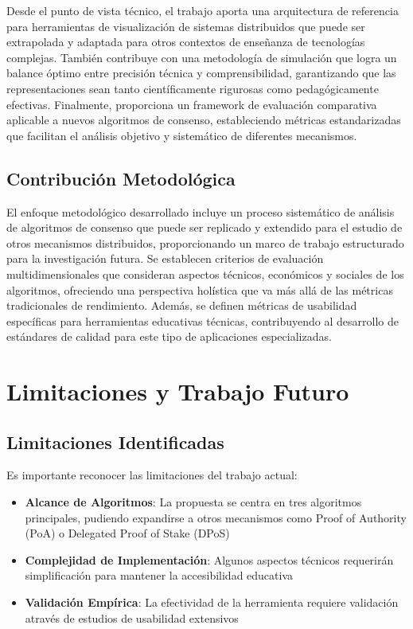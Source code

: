 \documentclass[spanish,12pt,letterpaper]{report}
\begin{document}
Desde el punto de vista técnico, el trabajo aporta una arquitectura de referencia para herramientas de visualización de sistemas distribuidos que puede ser extrapolada y adaptada para otros contextos de enseñanza de tecnologías complejas. También contribuye con una metodología de simulación que logra un balance óptimo entre precisión técnica y comprensibilidad, garantizando que las representaciones sean tanto científicamente rigurosas como pedagógicamente efectivas. Finalmente, proporciona un framework de evaluación comparativa aplicable a nuevos algoritmos de consenso, estableciendo métricas estandarizadas que facilitan el análisis objetivo y sistemático de diferentes mecanismos.

\subsection{Contribución Metodológica}

El enfoque metodológico desarrollado incluye un proceso sistemático de análisis de algoritmos de consenso que puede ser replicado y extendido para el estudio de otros mecanismos distribuidos, proporcionando un marco de trabajo estructurado para la investigación futura. Se establecen criterios de evaluación multidimensionales que consideran aspectos técnicos, económicos y sociales de los algoritmos, ofreciendo una perspectiva holística que va más allá de las métricas tradicionales de rendimiento. Además, se definen métricas de usabilidad específicas para herramientas educativas técnicas, contribuyendo al desarrollo de estándares de calidad para este tipo de aplicaciones especializadas.


\section{Limitaciones y Trabajo Futuro}

\subsection{Limitaciones Identificadas}

Es importante reconocer las limitaciones del trabajo actual:

\begin{itemize}
    \item \textbf{Alcance de Algoritmos}: La propuesta se centra en tres algoritmos principales, pudiendo expandirse a otros mecanismos como Proof of Authority (PoA) o Delegated Proof of Stake (DPoS)
    \item \textbf{Complejidad de Implementación}: Algunos aspectos técnicos requerirán simplificación para mantener la accesibilidad educativa
    \item \textbf{Validación Empírica}: La efectividad de la herramienta requiere validación através de estudios de usabilidad extensivos
\end{itemize}
\end{document}
